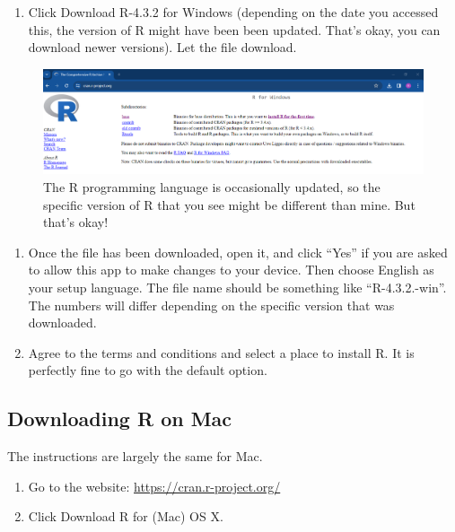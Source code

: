 \documentclass[
]{book}
\providecommand{\tightlist}{%
  \setlength{\itemsep}{0pt}\setlength{\parskip}{0pt}}
\begin{document}
\begin{enumerate}
\def\labelenumi{\arabic{enumi}.}
\setcounter{enumi}{3}
\tightlist
\item
  Click Download R-4.3.2 for Windows (depending on the date you accessed this, the version of R might have been been updated. That's okay, you can download newer versions). Let the file download.
\end{enumerate}

\begin{figure}
\centering
\includegraphics{img/01-base.png}
\caption{\label{fig:unnamed-chunk-7}The R programming language is occasionally updated, so the specific version of R that you see might be different than mine. But that's okay!}
\end{figure}

\begin{enumerate}
\def\labelenumi{\arabic{enumi}.}
\setcounter{enumi}{4}
\tightlist
\item
  Once the file has been downloaded, open it, and click ``Yes'' if you are asked to allow this app to make changes to your device. Then choose English as your setup language. The file name should be something like ``R-4.3.2.-win''. The numbers will differ depending on the specific version that was downloaded.
\item
  Agree to the terms and conditions and select a place to install R. It is perfectly fine to go with the default option.
\end{enumerate}

\hypertarget{downloading-r-on-mac}{%
\subsection{Downloading R on Mac}\label{downloading-r-on-mac}}

The instructions are largely the same for Mac.

\begin{enumerate}
\def\labelenumi{\arabic{enumi}.}
\item
  Go to the website: \url{https://cran.r-project.org/}
\item
  Click Download R for (Mac) OS X.
\end{enumerate}
\end{document}
